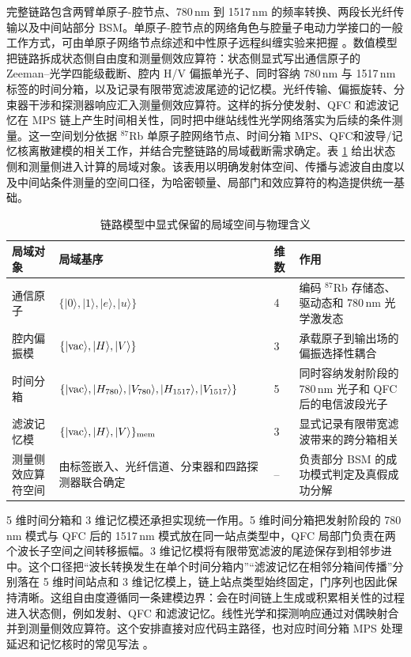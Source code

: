 完整链路包含两臂单原子-腔节点、780\,nm 到 1517\,nm 的频率转换、两段长光纤传输以及中间站部分 BSM。单原子-腔节点的网络角色与腔量子电动力学接口的一般工作方式，可由单原子网络节点综述和中性原子远程纠缠实验来把握 \cite{ReisererRempe2015CavityNetworks,vanleent2022entangling}。数值模型把链路拆成状态侧自由度和测量侧效应算符：状态侧显式写出通信原子的 Zeeman--光学四能级截断、腔内 H/V 偏振单光子、同时容纳 780\,nm 与 1517\,nm 标签的时间分箱，以及记录有限带宽滤波尾迹的记忆模。光纤传输、偏振旋转、分束器干涉和探测器响应汇入测量侧效应算符。这样的拆分使发射、QFC 和滤波记忆在 MPS 链上产生时间相关性，同时把中继站线性光学网络落实为后续的条件测量。这一空间划分依据 $^{87}$Rb 单原子腔网络节点\cite{Ritter2012ElementaryQuantumNetwork,vanleent2022entangling,ReisererRempe2015CavityNetworks}、时间分箱 MPS\cite{Pichler2016TimeDelaysMPS}、QFC\cite{Ikuta2018PolarizationInsensitiveQFC}和波导/记忆核离散建模\cite{ArranzRegidor2021WaveguideQED}的相关工作，并结合完整链路的局域截断需求确定。表 \ref{tab:ch3_local_spaces} 给出状态侧和测量侧进入计算的局域对象。该表用以明确发射体空间、传播与滤波自由度以及中间站条件测量的空间口径，为哈密顿量、局部门和效应算符的构造提供统一基础。
\begin{table}[htbp]
\centering
\caption{链路模型中显式保留的局域空间与物理含义}
\label{tab:ch3_local_spaces}
\renewcommand{\arraystretch}{1.15}
\begin{tabular}{p{2.7cm}p{5.8cm}p{1.2cm}p{4.6cm}}
\toprule
局域对象 & 局域基序 & 维数 & 作用 \\
\midrule
通信原子 & $\{|0\rangle,|1\rangle,|e\rangle,|u\rangle\}$ & 4 & 编码 $^{87}$Rb 存储态、驱动态和 780\,nm 光学激发态 \\
腔内偏振模 & $\{|{\rm vac}\rangle,|H\rangle,|V\rangle\}$ & 3 & 承载原子到输出场的偏振选择性耦合 \\
时间分箱 & $\{|{\rm vac}\rangle,\allowbreak |H_{780}\rangle,\allowbreak |V_{780}\rangle,\allowbreak |H_{1517}\rangle,\allowbreak |V_{1517}\rangle\}$ & 5 & 同时容纳发射阶段的 780\,nm 光子和 QFC 后的电信波段光子 \\
滤波记忆模 & $\{|{\rm vac}\rangle,|H\rangle,|V\rangle\}_{\rm mem}$ & 3 & 显式记录有限带宽滤波带来的跨分箱相关 \\
测量侧效应算符空间 & 由标签嵌入、光纤信道、分束器和四路探测器联合确定 & -- & 负责部分 BSM 的成功模式判定及真假成功分解 \\
\bottomrule
\end{tabular}
\end{table}


5 维时间分箱和 3 维记忆模还承担实现统一作用。5 维时间分箱把发射阶段的 780\,nm 模式与 QFC 后的 1517\,nm 模式放在同一站点类型中，QFC 局部门负责在两个波长子空间之间转移振幅。3 维记忆模将有限带宽滤波的尾迹保存到相邻步进中。这个口径把“波长转换发生在单个时间分箱内”“滤波记忆在相邻分箱间传播”分别落在 5 维时间站点和 3 维记忆模上，链上站点类型始终固定，门序列也因此保持清晰。这组自由度遵循同一条建模边界：会在时间链上生成或积累相关性的过程进入状态侧，例如发射、QFC 和滤波记忆。线性光学和探测响应通过对偶映射合并到测量侧效应算符。这个安排直接对应代码主路径，也对应时间分箱 MPS 处理延迟和记忆核时的常见写法 \cite{Pichler2016TimeDelaysMPS,Guimond2017DelayedCoherentFeedbackMPS,ArranzRegidor2021WaveguideQED}。

